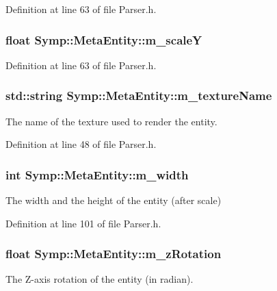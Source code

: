 Definition at line 63 of file Parser.\-h.

\hypertarget{struct_symp_1_1_meta_entity_a7df7f1627cf970035c9f5b6490264094}{
\subsubsection[{m\-\_\-scale\-Y}]{\setlength{\rightskip}{0pt plus 5cm}float Symp\-::\-Meta\-Entity\-::m\-\_\-scale\-Y}}\label{struct_symp_1_1_meta_entity_a7df7f1627cf970035c9f5b6490264094}


Definition at line 63 of file Parser.\-h.

\hypertarget{struct_symp_1_1_meta_entity_a9b261edfae185b1a230f496055911359}{
\subsubsection[{m\-\_\-texture\-Name}]{\setlength{\rightskip}{0pt plus 5cm}std\-::string Symp\-::\-Meta\-Entity\-::m\-\_\-texture\-Name}}\label{struct_symp_1_1_meta_entity_a9b261edfae185b1a230f496055911359}
The name of the texture used to render the entity. 

Definition at line 48 of file Parser.\-h.

\hypertarget{struct_symp_1_1_meta_entity_aa06fa85ccd50804fceea67020313b02d}{
\subsubsection[{m\-\_\-width}]{\setlength{\rightskip}{0pt plus 5cm}int Symp\-::\-Meta\-Entity\-::m\-\_\-width}}\label{struct_symp_1_1_meta_entity_aa06fa85ccd50804fceea67020313b02d}
The width and the height of the entity (after scale) 

Definition at line 101 of file Parser.\-h.

\hypertarget{struct_symp_1_1_meta_entity_aa99614c3bf9787205f7e2d98695563e0}{
\subsubsection[{m\-\_\-z\-Rotation}]{\setlength{\rightskip}{0pt plus 5cm}float Symp\-::\-Meta\-Entity\-::m\-\_\-z\-Rotation}}\label{struct_symp_1_1_meta_entity_aa99614c3bf9787205f7e2d98695563e0}
The Z-\/axis rotation of the entity (in radian). 

